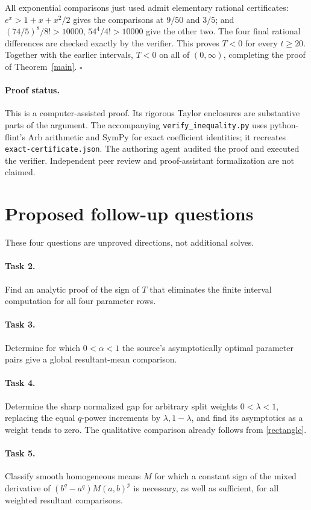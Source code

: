\documentclass[11pt]{article}
\begin{document}
All exponential comparisons just used admit elementary rational
certificates: \(e^x>1+x+x^2/2\) gives the comparisons at \(9/50\)
and \(3/5\); and
\((74/5)^8/8!>10000\), \(54^4/4!>10000\) give the other two.
The four final rational differences are checked exactly by the verifier.
This proves \(T<0\) for every \(t\ge20\). Together with the earlier
intervals, \(T<0\) on all of \((0,\infty)\), completing the proof
of Theorem~\ref{main}. \(\square\)

\paragraph{Proof status.}
This is a computer-assisted proof. Its rigorous Taylor enclosures
are substantive parts of the argument. The accompanying
\texttt{verify\_inequality.py} uses python-flint's Arb arithmetic
\cite{arb} and SymPy for exact coefficient identities; it recreates
\texttt{exact-certificate.json}. The authoring agent audited the proof
and executed the verifier. Independent peer review and
proof-assistant formalization are not claimed.

\section*{Proposed follow-up questions}
These four questions are unproved directions, not additional solves.
\paragraph{Task 2.}
Find an analytic proof of the sign of \(T\) that eliminates the finite
interval computation for all four parameter rows.
\paragraph{Task 3.}
Determine for which \(0<\alpha<1\) the source's asymptotically
optimal parameter pairs give a global resultant-mean comparison.
\paragraph{Task 4.}
Determine the sharp normalized gap for arbitrary split weights
\(0<\lambda<1\), replacing the equal \(q\)-power increments by
\(\lambda,1-\lambda\), and find its asymptotics as a weight tends to zero.
The qualitative comparison already follows from \eqref{rectangle}.
\paragraph{Task 5.}
Classify smooth homogeneous means \(M\) for which a constant sign of
the mixed derivative of \((b^q-a^q)M(a,b)^p\) is necessary, as well
as sufficient, for all weighted resultant comparisons.
\end{document}
